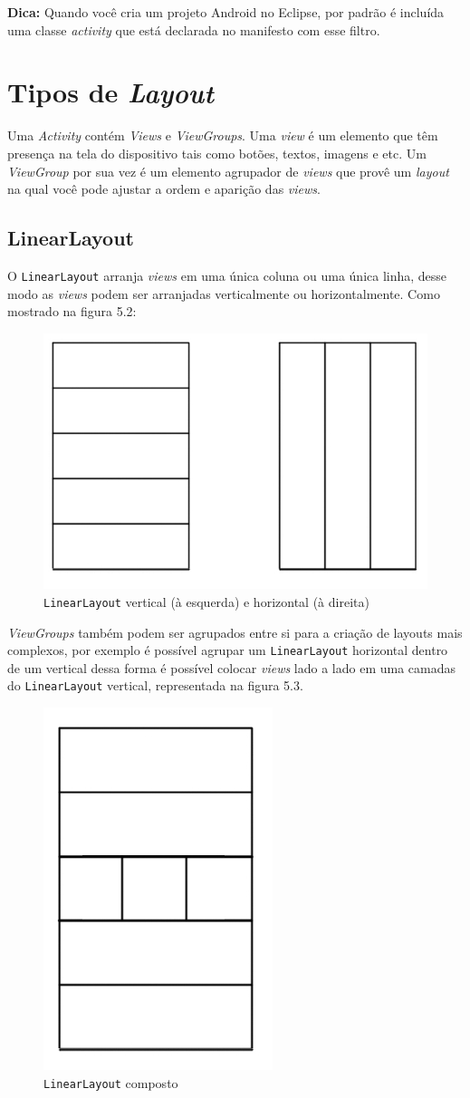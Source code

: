 \documentclass[a4paper,12pt,brazil]{book}
\begin{document}
\begin{singlespace}
\begin{framed}
\textbf{Dica:} Quando você cria um projeto Android no Eclipse, por padrão é incluída uma classe \emph{activity} que está declarada no manifesto com esse filtro.
\end{framed}

\section{Tipos de \emph{Layout}}
Uma \emph{Activity} contém \emph{Views} e \emph{ViewGroups}. Uma \emph{view} é um elemento que têm presença na tela do dispositivo tais como botões, textos, imagens e etc. Um \emph{ViewGroup} por sua vez é um elemento agrupador de \emph{views} que provê um \emph{layout} na qual você pode ajustar a ordem e aparição das \emph{views}. 

\subsection{LinearLayout}

O \texttt{LinearLayout} arranja \emph{views} em uma única coluna ou uma única linha, desse modo as \emph{views} podem ser arranjadas verticalmente ou horizontalmente. Como mostrado na figura 5.2:

\begin{figure}[H]
  \centering
  \includegraphics[width=.45\textwidth]{figuras/design/linearlayout.jpg}
  \caption{\texttt{LinearLayout} vertical (à esquerda) e horizontal (à direita)}
  \label{fig:e}
\end{figure}

\emph{ViewGroups} também podem ser agrupados entre si para a criação de layouts mais complexos, por exemplo é possível agrupar um \texttt{LinearLayout} horizontal dentro de um vertical dessa forma é possível colocar \emph{views} lado a lado em uma camadas do \texttt{LinearLayout} vertical, representada na figura 5.3.

\begin{figure}[H]
  \centering
  \includegraphics[width=.25\textwidth]{figuras/design/linearlayout-composto.jpg}
  \caption{\texttt{LinearLayout} composto}
  \label{fig:e}
\end{figure}


\end{singlespace}
\end{document}
